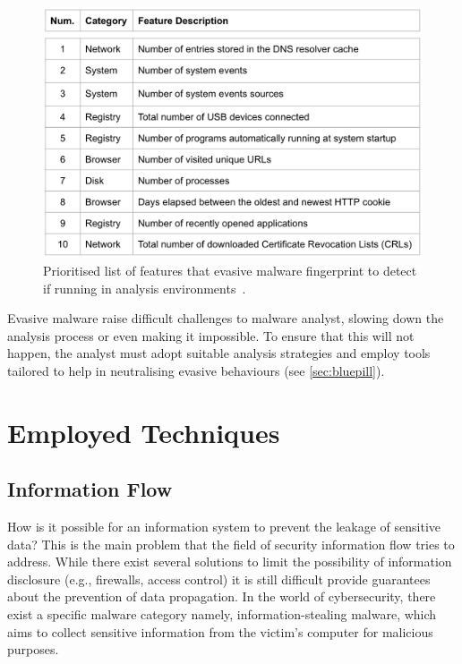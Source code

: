 \documentclass[LaM,binding=0.6cm]{sapthesis}
\begin{document}
\begin{figure}[h!]
\centering
\includegraphics[scale=.5]{images/background5}
\caption{Prioritised list of features that evasive malware fingerprint to detect if running in analysis environments~\cite{miramirkhani2017spotless}.}
\end{figure}
Evasive malware raise difficult challenges to malware analyst, slowing down the analysis process or even making it impossible. To ensure that this will not happen, the analyst must adopt suitable analysis strategies and employ tools tailored to help in neutralising evasive behaviours (see \autoref{sec:bluepill}).

\chapter{Employed Techniques}
\label{ch:chapter2}

\section{Information Flow}
\label{sec:informationflow}
How is it possible for an information system to prevent the leakage of sensitive data? This is the main problem that the field of security information flow tries to address. While there exist several solutions to limit the possibility of information disclosure (e.g., firewalls, access control) it is still difficult provide guarantees about the prevention of data propagation. In the world of cybersecurity, there exist a specific malware category namely, information-stealing malware, which aims to collect sensitive information from the victim's computer for malicious purposes.\\
\end{document}
